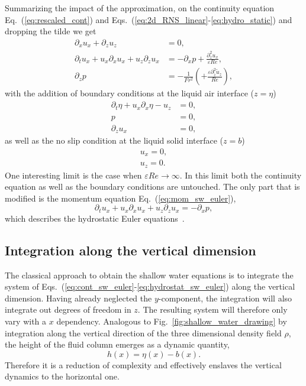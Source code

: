Summarizing the impact of the approximation, on the continuity equation Eq.~(\ref{eq:rescaled_cont}) and Eqs.~(\ref{eq:2d_RNS_linear}-\ref{eq:hydro_static}) and dropping the tilde we get 
\begin{align}
    \partial_x u_x + \partial_z u_z &= 0, \label{eq:cont_sw_euler}\\
    \partial_t u_x + u_x\partial_x u_x + u_z\partial_{z} u_x &= -\partial_x p + \frac{\partial_z^2 u_x}{\varepsilon Re}, \label{eq:mom_sw_euler}\\
    \partial_z p &= -\frac{1}{Fr^2} \left(+\frac{\varepsilon\partial_{\tilde{z}}^2 \tilde{u}_z}{Re}\right), \label{eq:hydrostat_sw_euler}
\end{align}
with the addition of boundary conditions at the liquid air interface ($z = \eta$)
\begin{align}
    \partial_t \eta + u_x\partial_x\eta - u_z &= 0, \label{eq:sw_boundaries_top_1}\\
    p &= 0, \label{eq:sw_boundaries_top_2}\\
    \partial_z u_x &= 0, \label{eq:sw_boundaries_top_3}
\end{align}
as well as the no slip condition at the liquid solid interface ($z = b$)
\begin{align}
    u_x = 0, \label{eq:no-slip_sw1}\\
    u_z = 0. \label{eq:no-slip_sw2}
\end{align}
One interesting limit is the case when $\varepsilon Re \rightarrow \infty$.
In this limit both the continuity equation as well as the boundary conditions are untouched.
The only part that is modified is the momentum equation Eq.~(\ref{eq:mom_sw_euler}),
\begin{equation}
    \partial_t u_x + u_x\partial_x u_x + u_z\partial_{z} u_x = -\partial_x p,
\end{equation}
which describes the hydrostatic Euler equations~\cite{brenierGeneralizedSolutionsHydrostatic2008}.

\subsection{Integration along the vertical dimension}
\label{subsec:int_sw}
The classical approach to obtain the shallow water equations is to integrate the system of Eqs.~(\ref{eq:cont_sw_euler}-\ref{eq:hydrostat_sw_euler}) along the vertical dimension.
Having already neglected the $y$-component, the integration will also integrate out degrees of freedom in $z$.
The resulting system will therefore only vary with a $x$ dependency.
Analogous to Fig.~\ref{fig:shallow_water_drawing} by integration along the vertical direction of the three dimensional density field $\rho$, the height of the fluid column emerges as a dynamic quantity,
\begin{equation}\label{eq:shallow_water_height}
    h(x) = \eta(x) - b(x).    
\end{equation}
Therefore it is a reduction of complexity and effectively enslaves the vertical dynamics to the horizontal one.

